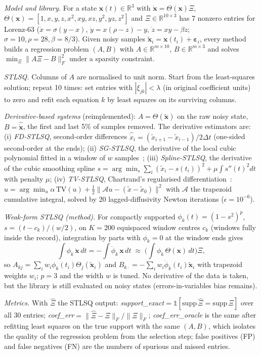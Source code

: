\textit{Model and library.} For a state $\mathbf{x}(t)\in\mathbb{R}^3$ with $\dot{\mathbf{x}}=\Theta(\mathbf{x})\Xi$, $\Theta(\mathbf{x})=[1,x,y,z,x^2,xy,xz,y^2,yz,z^2]$ and $\Xi\in\mathbb{R}^{10\times3}$ has 7 nonzero entries for Lorenz-63 ($\dot x=\sigma(y-x)$, $\dot y=x(\rho-z)-y$, $\dot z=xy-\beta z$; $\sigma=10,\rho=28,\beta=8/3$). Given noisy samples $\tilde{\mathbf{x}}_i=\mathbf{x}(t_i)+\boldsymbol\varepsilon_i$, every method builds a regression problem $(A,B)$ with $A\in\mathbb{R}^{m\times10}$, $B\in\mathbb{R}^{m\times3}$ and solves $\min_\Xi\|A\Xi-B\|_F^2$ under a sparsity constraint.

\textit{STLSQ.} Columns of $A$ are normalised to unit norm. Start from the least-squares solution; repeat 10 times: set entries with $|\xi_{jk}|<\lambda$ (in original coefficient units) to zero and refit each equation $k$ by least squares on its surviving columns.

\textit{Derivative-based systems} (reimplemented): $A=\Theta(\tilde{\mathbf{x}})$ on the raw noisy state, $B=\widehat{\dot{\mathbf{x}}}$, the first and last 5\% of samples removed. The derivative estimators are:
(i) \emph{FD-STLSQ}, second-order differences $\widehat{\dot x}_i=(\tilde x_{i+1}-\tilde x_{i-1})/2\Delta t$ (one-sided second-order at the ends);
(ii) \emph{SG-STLSQ}, the derivative of the local cubic polynomial fitted in a window of $w$ samples~\cite{savitzky1964smoothing};
(iii) \emph{Spline-STLSQ}, the derivative of the cubic smoothing spline $s=\arg\min_s \sum_i(\tilde x_i-s(t_i))^2+\mu\int s''(t)^2dt$ with penalty $\mu$;
(iv) \emph{TV-STLSQ}, Chartrand's regularised differentiation~\cite{chartrand2011numerical}: $u=\arg\min_u \alpha\,\mathrm{TV}(u)+\tfrac12\|\mathcal{A}u-(\tilde x-\tilde x_0)\|^2$ with $\mathcal{A}$ the trapezoid cumulative integral, solved by 20 lagged-diffusivity Newton iterations ($\epsilon=10^{-6}$).

\textit{Weak-form STLSQ (method).} For compactly supported $\phi_k(t)=(1-s^2)^p$, $s=(t-c_k)/(w/2)$, on $K=200$ equispaced window centres $c_k$ (windows fully inside the record), integration by parts with $\phi_k=0$ at the window ends gives
\begin{equation}
\int\phi_k\,\dot{\mathbf{x}}\,dt=-\int\dot\phi_k\,\mathbf{x}\,dt \;\approx\; \Big(\int\phi_k\,\Theta(\mathbf{x})\,dt\Big)\Xi,
\end{equation}
so $A_{kj}=\sum_i w_i\phi_k(t_i)\Theta_j(\tilde{\mathbf{x}}_i)$ and $B_{k\cdot}=-\sum_i w_i\dot\phi_k(t_i)\tilde{\mathbf{x}}_i$ with trapezoid weights $w_i$; $p=3$ and the width $w$ is tuned. No derivative of the data is taken, but the library is still evaluated on noisy states (errors-in-variables bias remains).

\textit{Metrics.} With $\hat\Xi$ the STLSQ output: \emph{support\_exact}$=\mathbb{1}[\mathrm{supp}\,\hat\Xi=\mathrm{supp}\,\Xi]$ over all 30 entries; \emph{coef\_err}$=\|\hat\Xi-\Xi\|_F/\|\Xi\|_F$; \emph{coef\_err\_oracle} is the same after refitting least squares on the true support with the same $(A,B)$, which isolates the quality of the regression problem from the selection step; false positives (FP) and false negatives (FN) are the numbers of spurious and missed entries.
